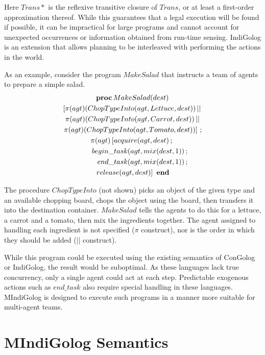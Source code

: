 \documentclass[letterpaper]{article}
\begin{document}
Here $Trans*$ is the reflexive transitive closure of $Trans$, or at least a
first-order approximation thereof.
While this guarantees that a legal execution
will be found if possible, it can be impractical for large programs
and cannot account for unexpected occurrences or information obtained
from run-time sensing.  IndiGolog \cite{giacomo99indigolog} is an extension
that allows planning to be interleaved with performing the actions in the world.

As an example, consider the program $MakeSalad$ that instructs a team of
agents to prepare a simple salad.
\begin{multline}
\label{eqn:MakeSalad}
\mathbf{proc}\,MakeSalad(dest)\\
\left[\pi(agt)(ChopTypeInto(agt,Lettuce,dest))\,||\right.\\
\pi(agt)(ChopTypeInto(agt,Carrot,dest))\,||\\
\left.\pi(agt)(ChopTypeInto(agt,Tomato,dest))\right]\,;\\
\pi(agt)\left[acquire(agt,dest)\,;\right.\\
 \shoveright{begin\_task(agt,mix(dest,1))\,;\quad}\\
 \shoveright{end\_task(agt,mix(dest,1))\,;\quad}\\
 \left.release(agt,dest)\right]\,\,\mathbf{end}
\end{multline}

The procedure $ChopTypeInto$ (not shown) picks an object of the given
type and an available chopping board, chops the object using the board,
then transfers it into the destination container. $MakeSalad$ tells
the agents to do this for a lettuce, a carrot and a tomato, then mix
the ingredients together. The agent assigned to handling
each ingredient is not specified ($\pi$ construct), nor is the order in which
they should be added ($||$ construct). 

While this program could be executed using the existing semantics of ConGolog
or IndiGolog, the result would be suboptimal.  As these languages lack true
concurrency, only a single agent could act at each step.
Predictable exogenous actions such
as $end\_task$ also require special handling in these languages.  MIndiGolog
is designed to execute such programs in a manner more suitable for multi-agent
teams.

\section{MIndiGolog Semantics}
\end{document}

